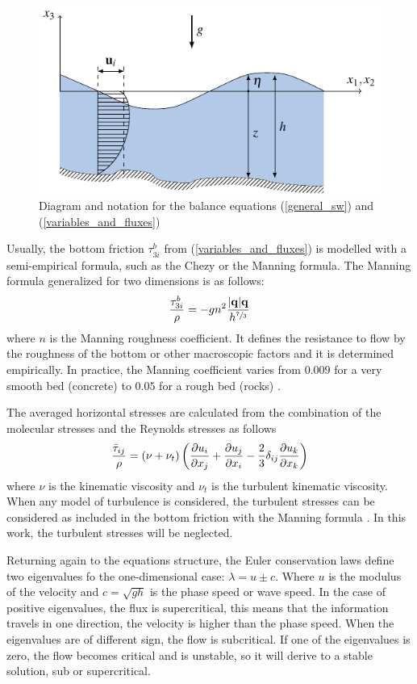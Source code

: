 \begin{figure}
    \centering
    \includegraphics[width=.8\textwidth]{img/eq/diagram.pdf}
    \caption{Diagram and notation for the balance equations (\ref{general_sw}) and (\ref{variables_and_fluxes})}
    \label{diagram}
\end{figure}



Usually, the bottom friction $\tau^b_{3i}$ from (\ref{variables_and_fluxes}) is modelled with a semi-empirical formula, such as the Chezy or the Manning formula. The Manning formula generalized for two dimensions is as follows:
\begin{equation}
\frac{\tau^b_{3i}}{\rho} = -gn^2\frac{\lvert\mathbf{q}\rvert\mathbf{q}}{h^{\sfrac{7}{3}}}
\end{equation}
where $n$ is the Manning roughness coefficient. It defines the resistance to flow by the roughness of the bottom or other macroscopic factors and it is determined empirically. In practice, the Manning coefficient varies from $0.009$ for a very smooth bed (concrete) to $0.05$ for a rough bed (rocks) \cite{chow1988}.


The averaged horizontal stresses are calculated from the combination of the molecular stresses and the Reynolds stresses as follows
\begin{equation} \label{stresses}
\frac{\bar{\tau}_{ij}}{\rho} = (\nu + \nu_t)\left(
    \frac{\partial u_i}{\partial x_j} + \frac{\partial u_j}{\partial x_i} -\frac{2}{3}\delta_{ij}\frac{\partial u_k}{\partial x_k} \right)
\end{equation}
where $\nu$ is the kinematic viscosity and $\nu_t$ is the turbulent kinematic viscosity. When any model of turbulence is considered, the turbulent stresses can be considered as included in the bottom friction with the Manning formula \cite{blade2005}. In this work, the turbulent stresses will be neglected.



Returning again to the equations structure, the Euler conservation laws define two eigenvalues fo the one-dimensional case: $\lambda = u \pm c$. Where $u$ is the modulus of the velocity and $c=\sqrt{gh}$ is the phase speed or wave speed.
In the case of positive eigenvalues, the flux is supercritical, this means that the information travels in one direction, the velocity is higher than the phase speed. When the eigenvalues are of different sign, the flow is subcritical. If one of the eigenvalues is zero, the flow becomes critical and is unstable, so it will derive to a stable solution, sub or supercritical.

